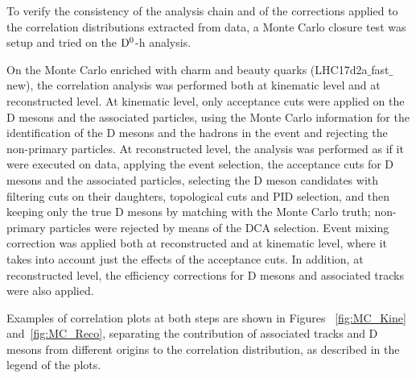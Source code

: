 \label{MCclosure}
To verify the consistency of the analysis chain and of the corrections applied to the  correlation distributions extracted from data, a Monte Carlo closure test was setup and tried on the ${\rm D^0}$-h analysis.

On the Monte Carlo enriched with charm and beauty quarks (LHC17d2a$\_$fast$\_$new), the correlation analysis was performed both at kinematic level and at reconstructed level. At kinematic level, only acceptance cuts were applied on the D mesons and the associated particles, using the Monte Carlo information for the identification of the D mesons and the hadrons in the event and rejecting the non-primary particles. At reconstructed level, the analysis was performed as if it were executed on data, applying the event selection, the acceptance cuts for D mesons and the associated particles, selecting the D meson candidates with filtering cuts on their daughters, topological cuts and PID selection, and then keeping only the true D mesons by matching with the Monte Carlo truth; non-primary particles were rejected by means of the DCA selection. Event mixing correction was applied both at reconstructed and at kinematic level, where it takes into account just the effects of the acceptance cuts. In addition, at reconstructed level, the efficiency corrections for D mesons and associated tracks were also applied.

Examples of correlation plots at both steps are shown in Figures ~\ref{fig:MC_Kine} and~\ref{fig:MC_Reco}, separating the contribution of associated tracks and D mesons from different origins to the correlation distribution, as described in the legend of the plots.

